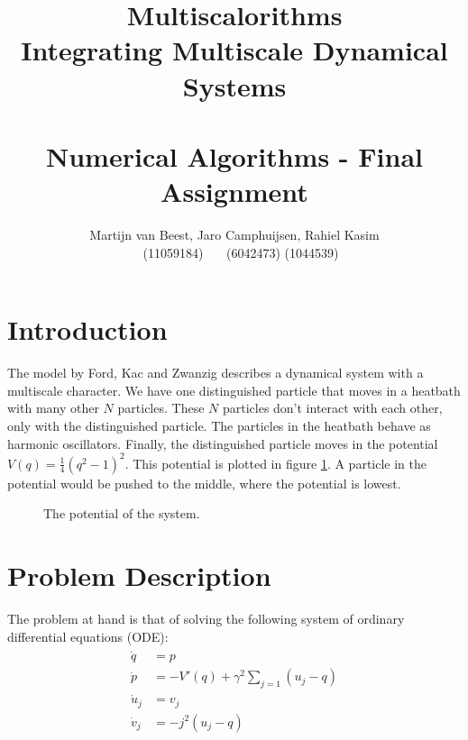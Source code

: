 \documentclass{article}
\begin{document}
\title{Multiscalorithms\\
		\small Integrating Multiscale Dynamical Systems\\~\\
        \small Numerical Algorithms - Final Assignment}
\author{Martijn van Beest, Jaro Camphuijsen, Rahiel Kasim\\
~~~~~(11059184) \hfill ~~~(6042473) \hfill (1044539)~~~}
\maketitle

\tableofcontents
\section{Introduction}
The model by Ford, Kac and Zwanzig \cite{fordkac} describes a dynamical system with a multiscale character. We have one distinguished particle that moves in a heatbath with many other $N$ particles. These $N$ particles don't interact with each other, only with the distinguished particle. The particles in the heatbath behave as harmonic oscillators. Finally, the distinguished particle moves in the potential $V(q) = \frac{1}{4} (q^2 - 1)^2$. This potential is plotted in figure \ref{fig:pot}. A particle in the potential would be pushed to the middle, where the potential is lowest.
\begin{figure}
\caption{The potential of the system.}
\label{fig:pot}
\end{figure}

\section{Problem Description}
The problem at hand is that of solving the following system of ordinary differential equations (ODE):
\begin{align}
\begin{split}
\dot q &= p\\
\dot p &= - V\prime(q) + \gamma ^2 \sum \limits_{j=1}\left( u_{j} -q\right)\\
\dot u_j &= v_j\\
\dot v_j &= -j^2(u_j - q)
\end{split}
\label{eq:ODE}
\end{align}
\end{document}
